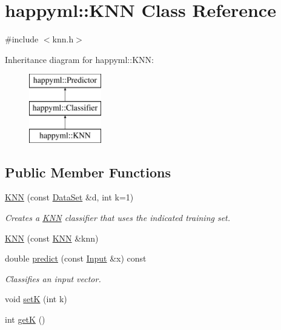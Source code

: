 \hypertarget{classhappyml_1_1KNN}{}\section{happyml\+:\+:K\+NN Class Reference}
\label{classhappyml_1_1KNN}


{\ttfamily \#include $<$knn.\+h$>$}

Inheritance diagram for happyml\+:\+:K\+NN\+:\begin{figure}[H]
\begin{center}
\leavevmode
\includegraphics[height=3.000000cm]{classhappyml_1_1KNN}
\end{center}
\end{figure}
\subsection*{Public Member Functions}
\begin{DoxyCompactItemize}
\item 
\hyperlink{classhappyml_1_1KNN_a369c46398ffc867423133aaf1c7a5a02}{K\+NN} (const \hyperlink{classhappyml_1_1DataSet}{Data\+Set} \&d, int k=1)
\begin{DoxyCompactList}\small\item\em Creates a \hyperlink{classhappyml_1_1KNN}{K\+NN} classifier that uses the indicated training set. \end{DoxyCompactList}\item 
\hyperlink{classhappyml_1_1KNN_a0c93adb094f8c380b8f38aace10ea6e6}{K\+NN} (const \hyperlink{classhappyml_1_1KNN}{K\+NN} \&knn)
\item 
double \hyperlink{classhappyml_1_1KNN_aac58df51b7b343dfd1fb359117341867}{predict} (const \hyperlink{namespacehappyml_a03602d1ec49393790b8a0449f40cd01f}{Input} \&x) const 
\begin{DoxyCompactList}\small\item\em Classifies an input vector. \end{DoxyCompactList}\item 
void \hyperlink{classhappyml_1_1KNN_adb49a173a9ed23725c23964cd333b686}{setK} (int k)
\item 
int \hyperlink{classhappyml_1_1KNN_a66ebb208b2c3138c6d7b23d8204103b7}{getK} ()
\end{DoxyCompactItemize}


